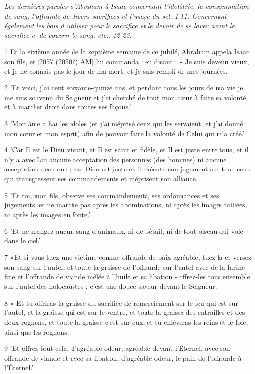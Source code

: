 
\par \textit{Les dernières paroles d'Abraham à Isaac concernant l'idolâtrie, la consommation de sang, l'offrande de divers sacrifices et l'usage du sel, 1-11. Concernant également les bois à utiliser pour le sacrifice et le devoir de se laver avant le sacrifice et de couvrir le sang, etc., 12-25.}

\par 1 Et la sixième année de la septième semaine de ce jubilé, Abraham appela Isaac son fils, et [2057 (2050?) AM] lui commanda : en disant : « Je suis devenu vieux, et je ne connais pas le jour de ma mort, et je suis rempli de mes journées.
\par 2 'Et voici, j'ai cent soixante-quinze ans, et pendant tous les jours de ma vie je me suis souvenu du Seigneur et j'ai cherché de tout mon cœur à faire sa volonté et à marcher droit dans toutes ses façons.'
\par 3 'Mon âme a haï les idoles (et j'ai méprisé ceux qui les servaient, et j'ai donné mon cœur et mon esprit) afin de pouvoir faire la volonté de Celui qui m'a créé.'
\par 4 'Car Il est le Dieu vivant, et Il est saint et fidèle, et Il est juste entre tous, et il n'y a avec Lui aucune acceptation des personnes (des hommes) ni aucune acceptation des dons ; car Dieu est juste et il exécute son jugement sur tous ceux qui transgressent ses commandements et méprisent son alliance.
\par 5 'Et toi, mon fils, observe ses commandements, ses ordonnances et ses jugements, et ne marche pas après les abominations, ni après les images taillées, ni après les images en fonte.'
\par 6 'Et ne mangez aucun sang d'animaux, ni de bétail, ni de tout oiseau qui vole dans le ciel.'
\par 7 «Et si vous tuez une victime comme offrande de paix agréable, tuez-la et versez son sang sur l'autel, et toute la graisse de l'offrande sur l'autel avec de la farine fine et l'offrande de viande mêlée à l'huile et sa libation - offrez-les tous ensemble sur l'autel des holocaustes ; c'est une douce saveur devant le Seigneur.
\par 8 « Et tu offriras la graisse du sacrifice de remerciement sur le feu qui est sur l'autel, et la graisse qui est sur le ventre, et toute la graisse des entrailles et des deux rognons, et toute la graisse c'est sur eux, et tu enlèveras les reins et le foie, ainsi que les rognons.
\par 9 'Et offrez tout cela, d'agréable odeur, agréable devant l'Éternel, avec son offrande de viande et avec sa libation, d'agréable odeur, le pain de l'offrande à l'Éternel.'
